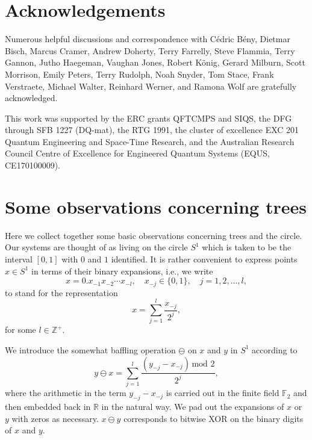 \documentclass[11pt,oneside]{amsart}
\theoremstyle{plain}%
\theoremstyle{definition}
\theoremstyle{remark}
\begin{document}
\section*{Acknowledgements}
Numerous helpful discussions and correspondence with C\'edric B\'eny, Dietmar Bisch, Marcus Cramer, Andrew Doherty, Terry Farrelly, Steve Flammia, Terry Gannon, Jutho Haegeman, Vaughan Jones, Robert K\"onig, Gerard Milburn, Scott Morrison, Emily Peters, Terry Rudolph, Noah Snyder, Tom Stace, Frank Verstraete, Michael Walter, Reinhard Werner, and Ramona Wolf are gratefully acknowledged.

This work was supported by the ERC grants QFTCMPS and SIQS, the DFG through SFB 1227 (DQ-mat), the RTG 1991, the cluster of excellence EXC 201 Quantum Engineering and Space-Time Research, and the Australian Research Council Centre of Excellence for Engineered Quantum Systems (EQUS, CE170100009).



\appendix

\section{Some observations concerning trees}\label{app:trees}

Here we collect together some basic observations concerning trees and the circle. Our systems are thought of as living on the circle $S^1$ which is taken to be the interval $[0,1]$ with $0$ and $1$ identified. It is rather convenient to express points $x\in S^1$ in terms of their binary expansions, i.e., we write
\begin{equation}
	x = 0.x_{-1}x_{-2}\cdots x_{-l}, \quad x_{-j} \in \{0,1\}, \quad j = 1, 2, \ldots, l,
\end{equation}
to stand for the representation
\begin{equation}
	x = \sum_{j=1}^l \frac{x_{-j}}{2^{j}},
\end{equation}
for some $l\in \mathbb{Z}^+$.

We introduce the somewhat baffling operation $\ominus$ on $x$ and $y$ in $S^1$ according to
\begin{equation}
	y\ominus x = \sum_{j=1}^l \frac{(y_{-j}-x_{-j})\, \text{mod $2$}}{2^{j}},
\end{equation}
where the arithmetic in the term $y_{-j}-x_{-j}$ is carried out in the finite field $\mathbb{F}_2$ and then embedded back in $\mathbb{R}$ in the natural way.
We pad out the expansions of $x$ or $y$ with zeros as necessary. $x\ominus y$ corresponds to bitwise XOR on the binary digits of $x$ and $y$.
\end{document}
